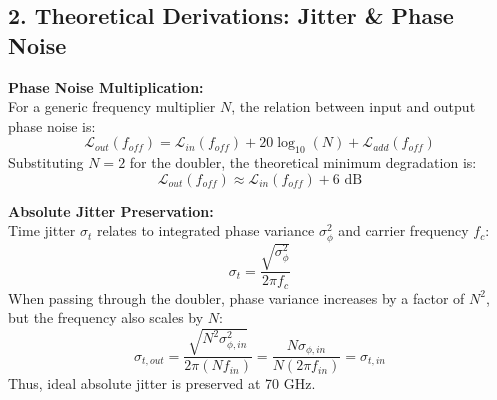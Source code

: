 \documentclass[12pt]{article}
\begin{document}
\begin{center}
\end{center}

\vspace{1cm}
\subsection*{2. Theoretical Derivations: Jitter \& Phase Noise}

\textbf{Phase Noise Multiplication:} \\
For a generic frequency multiplier $N$, the relation between input and output phase noise is:
\begin{equation}
    \mathcal{L}_{out}(f_{off}) = \mathcal{L}_{in}(f_{off}) + 20\log_{10}(N) + \mathcal{L}_{add}(f_{off})
\end{equation}
Substituting $N=2$ for the doubler, the theoretical minimum degradation is:
\begin{equation}
    \mathcal{L}_{out}(f_{off}) \approx \mathcal{L}_{in}(f_{off}) + 6\text{ dB}
\end{equation}

\textbf{Absolute Jitter Preservation:} \\
Time jitter $\sigma_t$ relates to integrated phase variance $\sigma_\phi^2$ and carrier frequency $f_c$:
\begin{equation}
    \sigma_t = \frac{\sqrt{\sigma_\phi^2}}{2\pi f_c}
\end{equation}
When passing through the doubler, phase variance increases by a factor of $N^2$, but the frequency also scales by $N$:
\begin{equation}
    \sigma_{t,out} = \frac{\sqrt{N^2 \sigma_{\phi,in}^2}}{2\pi (N f_{in})} = \frac{N \sigma_{\phi,in}}{N (2\pi f_{in})} = \sigma_{t,in}
\end{equation}
Thus, ideal absolute jitter is preserved at 70 GHz.
\end{document}
